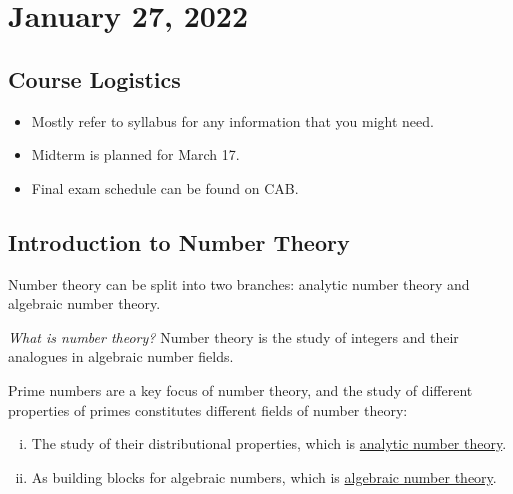 \setcounter{section}{-1}
\section{January 27, 2022}
\subsection{Course Logistics}
\begin{itemize}
    \item Mostly refer to syllabus for any information that you might need. 
    \item Midterm is planned for March 17. 
    \item Final exam schedule can be found on CAB. 
\end{itemize}

\subsection{Introduction to Number Theory}
Number theory can be split into two branches: analytic number theory and algebraic number theory. 

\emph{What is number theory?} Number theory is the study of integers and their analogues in algebraic number fields. 

Prime numbers are a key focus of number theory, and the study of different properties of primes constitutes different fields of number theory: 
\begin{enumerate}[i.]
    \item The study of their distributional properties, which is \ul{analytic number theory}. 
    \item As building blocks for algebraic numbers, which is \ul{algebraic number theory}. 
\end{enumerate}

